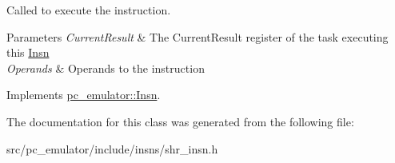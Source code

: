 Called to execute the instruction. 


\begin{DoxyParams}{Parameters}
{\em Current\+Result} & The Current\+Result register of the task executing this \hyperlink{classpc__emulator_1_1Insn}{Insn} \\
\hline
{\em Operands} & Operands to the instruction \\
\hline
\end{DoxyParams}


Implements \hyperlink{classpc__emulator_1_1Insn_a103d27030e872a799e313df16c1f3d66}{pc\+\_\+emulator\+::\+Insn}.



The documentation for this class was generated from the following file\+:\begin{DoxyCompactItemize}
\item 
src/pc\+\_\+emulator/include/insns/shr\+\_\+insn.\+h\end{DoxyCompactItemize}
